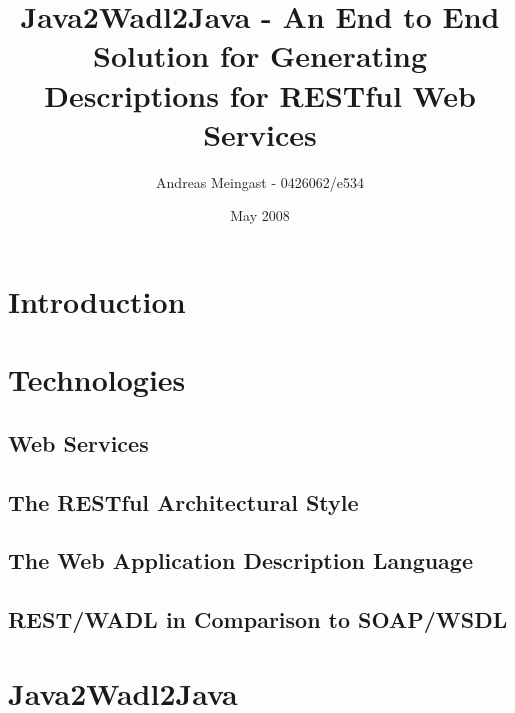 \documentclass[a4paper,12pt]{article}
\begin{document}
\title{Java2Wadl2Java - An End to End Solution for Generating Descriptions for RESTful Web Services}
\author{Andreas Meingast - 0426062/e534}

\date{May 2008}

\maketitle

\vspace{6cm}

\begin{abstract}

\end{abstract}

\newpage

\tableofcontents

\newpage

\section{Introduction}


\section{Technologies}

\subsection{Web Services}


\subsection{The RESTful Architectural Style}


\subsection{The  Web Application Description Language}


\subsection{REST/WADL in Comparison to SOAP/WSDL}


\section{Java2Wadl2Java}
\end{document}
